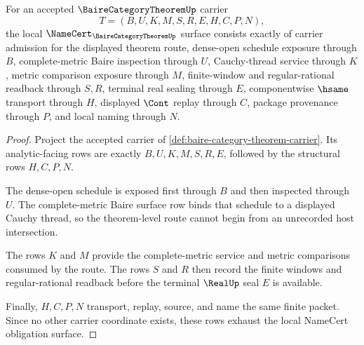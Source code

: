 \begin{theorem}
\label{thm:baire-category-theorem-namecert-obligations}
For an accepted $\BaireCategoryTheoremUp$ carrier
$$
T=(B,U,K,M,S,R,E,H,C,P,N),
$$
the local $\NameCert_{\BaireCategoryTheoremUp}$ surface consists exactly of carrier admission for the displayed theorem route, dense-open schedule exposure through $B$, complete-metric Baire inspection through $U$, Cauchy-thread service through $K$, metric comparison exposure through $M$, finite-window and regular-rational readback through $S,R$, terminal real sealing through $E$, componentwise $\hsame$ transport through $H$, displayed $\Cont$ replay through $C$, package provenance through $P$, and local naming through $N$.
\end{theorem}
\begin{proof}
Project the accepted carrier of \autoref{def:baire-category-theorem-carrier}. Its analytic-facing rows are exactly $B,U,K,M,S,R,E$, followed by the structural rows $H,C,P,N$.

The dense-open schedule is exposed first through $B$ and then inspected through $U$. The complete-metric Baire surface row binds that schedule to a displayed Cauchy thread, so the theorem-level route cannot begin from an unrecorded host intersection.

The rows $K$ and $M$ provide the complete-metric service and metric comparisons consumed by the route. The rows $S$ and $R$ then record the finite windows and regular-rational readback before the terminal $\RealUp$ seal $E$ is available.

Finally, $H,C,P,N$ transport, replay, source, and name the same finite packet. Since no other carrier coordinate exists, these rows exhaust the local NameCert obligation surface.
\end{proof}

